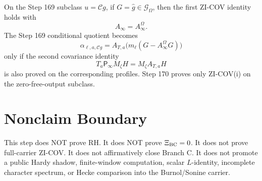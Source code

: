 \documentclass[11pt]{article}
\newcommand{\Psym}{\mathsf P_\infty}
\newcommand{\Mz}{M_\zeta}
\newcommand{\Chat}{\mathcal C}
\begin{document}
On the Step 169 subclass \(u=\Chat g\), if \(G=\widehat g\in\mathcal G_\Omega\),
then the first ZI-COV identity holds with
\[
  A_\infty=A_\infty^\Omega.
\]
The Step 169 conditional quotient becomes
\[
  \alpha_{\ell,a,\Chat g}
  =
  A_{T,a}\bigl(m_\ell(G-A_\infty^\Omega G)\bigr)
\]
only if the second covariance identity
\[
  T_a\Psym\Mz H=\Mz A_{T,a}H
\]
is also proved on the corresponding profiles. Step 170 proves only ZI-COV(i)
on the zero-free-output subclass.

\section{Nonclaim Boundary}

This step does NOT prove RH. It does NOT prove \(\Xi_{\rm BC}=0\). It does not
prove full-carrier ZI-COV. It does not affirmatively close Branch C. It does
not promote a public Hardy shadow, finite-window computation, scalar
\(L\)-identity, incomplete character spectrum, or Hecke comparison into the
Burnol/Sonine carrier.
\end{document}
